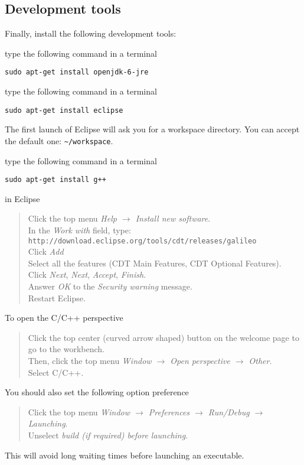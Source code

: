 \subsection{Development tools}
Finally, install the following development tools:

\begin{list}{}{}

\item[\textbf{JRE\footnote{Java Runtime Environment}:}] type the following command in a terminal
\begin{verbatim}
sudo apt-get install openjdk-6-jre
\end{verbatim}


\item [\textbf{Eclipse:}] type the following command in a terminal
\begin{verbatim}
sudo apt-get install eclipse
\end{verbatim}
The first launch of Eclipse will ask you for a workspace directory. You can accept the default one: \verb=~/workspace=.


\item [\textbf{G++\footnote{GNU C++ Compiler}:}] type the following command in a terminal
\begin{verbatim}
sudo apt-get install g++
\end{verbatim}


\item [\textbf{CDT plugin:}] in Eclipse
\begin{quote}
Click the top menu \emph{Help $\rightarrow$ Install new software}. \\
In the \emph{Work with} field, type: \verb=http://download.eclipse.org/tools/cdt/releases/galileo= \\
Click \emph{Add} \\
Select all the features (CDT Main Features, CDT Optional Features). \\
Click \emph{Next}, \emph{Next}, \emph{Accept}, \emph{Finish}. \\
Answer \emph{OK} to the \emph{Security warning} message. \\
Restart Eclipse.
\end{quote}
To open the C/C++ perspective
\begin{quote}
Click the top center (curved arrow shaped) button on the welcome page to go to the workbench. \\
Then, click the top menu \emph{Window $\rightarrow$ Open perspective $\rightarrow$ Other}. \\
Select C/C++.
\end{quote}
You should also set the following option preference
\begin{quote}
Click the top menu\emph{ Window $\rightarrow$ Preferences $\rightarrow$ Run/Debug $\rightarrow$ Launching}. \\
Unselect \emph{build (if required) before launching}.
\end{quote}
This will avoid long waiting times before launching an executable.



\end{list}
